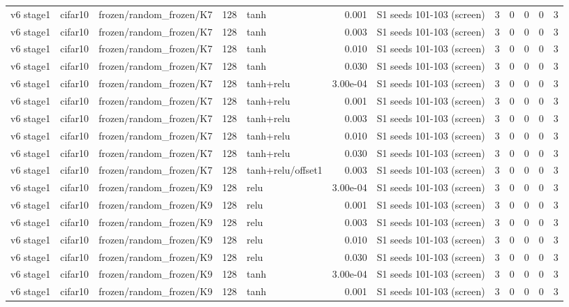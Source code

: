 \begin{table}[htbp]
{\begin{tabular}{@{}lllrlrlrrrrr@{}}
v6 stage1 & cifar10 & frozen/random\_frozen/K7 & 128 & tanh & 0.001 & S1 seeds 101-103 (screen) & 3 & 0 & 0 & 0 & 3 \\
v6 stage1 & cifar10 & frozen/random\_frozen/K7 & 128 & tanh & 0.003 & S1 seeds 101-103 (screen) & 3 & 0 & 0 & 0 & 3 \\
v6 stage1 & cifar10 & frozen/random\_frozen/K7 & 128 & tanh & 0.010 & S1 seeds 101-103 (screen) & 3 & 0 & 0 & 0 & 3 \\
v6 stage1 & cifar10 & frozen/random\_frozen/K7 & 128 & tanh & 0.030 & S1 seeds 101-103 (screen) & 3 & 0 & 0 & 0 & 3 \\
v6 stage1 & cifar10 & frozen/random\_frozen/K7 & 128 & tanh+relu & 3.00e-04 & S1 seeds 101-103 (screen) & 3 & 0 & 0 & 0 & 3 \\
v6 stage1 & cifar10 & frozen/random\_frozen/K7 & 128 & tanh+relu & 0.001 & S1 seeds 101-103 (screen) & 3 & 0 & 0 & 0 & 3 \\
v6 stage1 & cifar10 & frozen/random\_frozen/K7 & 128 & tanh+relu & 0.003 & S1 seeds 101-103 (screen) & 3 & 0 & 0 & 0 & 3 \\
v6 stage1 & cifar10 & frozen/random\_frozen/K7 & 128 & tanh+relu & 0.010 & S1 seeds 101-103 (screen) & 3 & 0 & 0 & 0 & 3 \\
v6 stage1 & cifar10 & frozen/random\_frozen/K7 & 128 & tanh+relu & 0.030 & S1 seeds 101-103 (screen) & 3 & 0 & 0 & 0 & 3 \\
v6 stage1 & cifar10 & frozen/random\_frozen/K7 & 128 & tanh+relu/offset1 & 0.003 & S1 seeds 101-103 (screen) & 3 & 0 & 0 & 0 & 3 \\
v6 stage1 & cifar10 & frozen/random\_frozen/K9 & 128 & relu & 3.00e-04 & S1 seeds 101-103 (screen) & 3 & 0 & 0 & 0 & 3 \\
v6 stage1 & cifar10 & frozen/random\_frozen/K9 & 128 & relu & 0.001 & S1 seeds 101-103 (screen) & 3 & 0 & 0 & 0 & 3 \\
v6 stage1 & cifar10 & frozen/random\_frozen/K9 & 128 & relu & 0.003 & S1 seeds 101-103 (screen) & 3 & 0 & 0 & 0 & 3 \\
v6 stage1 & cifar10 & frozen/random\_frozen/K9 & 128 & relu & 0.010 & S1 seeds 101-103 (screen) & 3 & 0 & 0 & 0 & 3 \\
v6 stage1 & cifar10 & frozen/random\_frozen/K9 & 128 & relu & 0.030 & S1 seeds 101-103 (screen) & 3 & 0 & 0 & 0 & 3 \\
v6 stage1 & cifar10 & frozen/random\_frozen/K9 & 128 & tanh & 3.00e-04 & S1 seeds 101-103 (screen) & 3 & 0 & 0 & 0 & 3 \\
v6 stage1 & cifar10 & frozen/random\_frozen/K9 & 128 & tanh & 0.001 & S1 seeds 101-103 (screen) & 3 & 0 & 0 & 0 & 3 \\

\end{tabular}}
\end{table}
